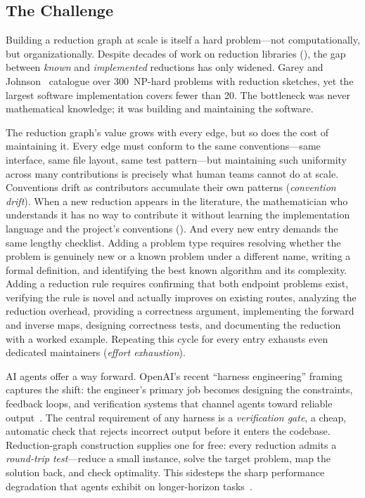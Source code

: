 \documentclass[conference]{IEEEtran}
\begin{document}
\subsection{The Challenge}

Building a reduction graph at scale is itself a hard problem---not computationally, but organizationally.
Despite decades of work on reduction libraries (), the gap between \emph{known} and \emph{implemented} reductions has only widened.
Garey and Johnson~\cite{garey1979} catalogue over 300~NP-hard problems with reduction sketches, yet the largest software implementation covers fewer than 20.
The bottleneck was never mathematical knowledge; it was building and maintaining the software.

The reduction graph's value grows with every edge, but so does the cost of maintaining it.
Every edge must conform to the same conventions---same interface, same file layout, same test pattern---but maintaining such uniformity across many contributions is precisely what human teams cannot do at scale.
Conventions drift as contributors accumulate their own patterns (\emph{convention drift}).
When a new reduction appears in the literature, the mathematician who understands it has no way to contribute it without learning the implementation language and the project's conventions ().
And every new entry demands the same lengthy checklist.
Adding a problem type requires resolving whether the problem is genuinely new or a known problem under a different name, writing a formal definition, and identifying the best known algorithm and its complexity.
Adding a reduction rule requires confirming that both endpoint problems exist, verifying the rule is novel and actually improves on existing routes, analyzing the reduction overhead, providing a correctness argument, implementing the forward and inverse maps, designing correctness tests, and documenting the reduction with a worked example.
Repeating this cycle for every entry exhausts even dedicated maintainers (\emph{effort exhaustion}).

AI agents offer a way forward.
OpenAI's recent ``harness engineering'' framing captures the shift: the engineer's primary job becomes designing the constraints, feedback loops, and verification systems that channel agents toward reliable output~\cite{OpenAI2026HarnessEngineering}.
The central requirement of any harness is a \emph{verification gate}, a cheap, automatic check that rejects incorrect output before it enters the codebase.
Reduction-graph construction supplies one for free: every reduction admits a \emph{round-trip test}---reduce a small instance, solve the target problem, map the solution back, and check optimality.
This sidesteps the sharp performance degradation that agents exhibit on longer-horizon tasks~\cite{Thai2025SWEEVO, Deng2025SWEBenchPro}.
\end{document}
